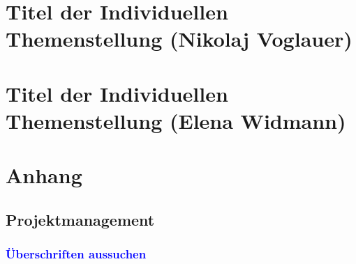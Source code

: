 \documentclass{article}
\begin{document}
\newpage
\section{Titel der Individuellen Themenstellung (Nikolaj Voglauer)}

\newpage
\section{Titel der Individuellen Themenstellung (Elena Widmann)}

\newpage
\section{Anhang}
\subsection{Projektmanagement}
\subsubsection{\textcolor{blue}{Überschriften aussuchen}}

\newpage

\printbibliography
\end{document}
